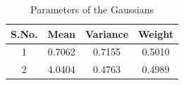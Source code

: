 \documentclass[journal, compsoc]{IEEEtran}
\begin{document}
\begin{table}[!h]
\renewcommand{\arraystretch}{0.4}
\caption{Parameters of the Gaussians}
\label{table:parameters}
\centering
\begin{tabular}{|c|c|c|c|}
\hline
{\bfseries S.No.} & {\bfseries Mean} & {\bfseries Variance} & {\bfseries Weight}\\
\hline \hline
1 & 0.7062 & 0.7155 & 0.5010\\
\hline
2 & 4.0404 & 0.4763 & 0.4989\\
\hline
\end{tabular}
\end{table}
\nocite{Do2008}
\nocite{HMM_Stamp}

\end{document}
